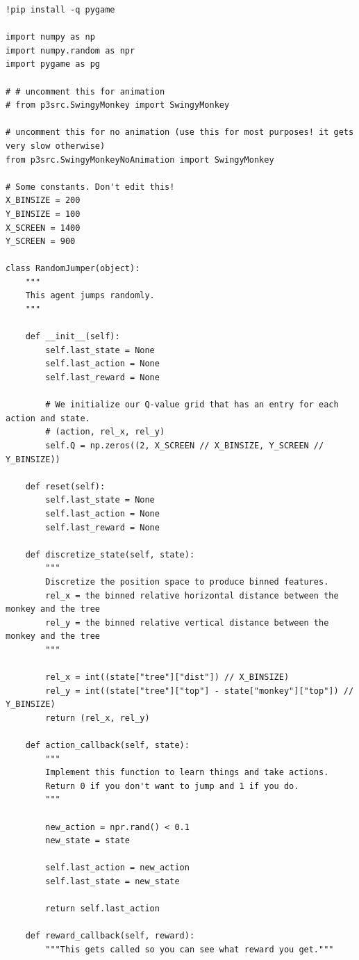 \documentclass[submit]{../harvardml}
\begin{document}
\lstset{style=pythonstyle}

\begin{lstlisting}
!pip install -q pygame

import numpy as np
import numpy.random as npr
import pygame as pg

# # uncomment this for animation
# from p3src.SwingyMonkey import SwingyMonkey

# uncomment this for no animation (use this for most purposes! it gets very slow otherwise)
from p3src.SwingyMonkeyNoAnimation import SwingyMonkey

# Some constants. Don't edit this!
X_BINSIZE = 200
Y_BINSIZE = 100
X_SCREEN = 1400
Y_SCREEN = 900

class RandomJumper(object):
    """
    This agent jumps randomly.
    """

    def __init__(self):
        self.last_state = None
        self.last_action = None
        self.last_reward = None

        # We initialize our Q-value grid that has an entry for each action and state.
        # (action, rel_x, rel_y)
        self.Q = np.zeros((2, X_SCREEN // X_BINSIZE, Y_SCREEN // Y_BINSIZE))

    def reset(self):
        self.last_state = None
        self.last_action = None
        self.last_reward = None

    def discretize_state(self, state):
        """
        Discretize the position space to produce binned features.
        rel_x = the binned relative horizontal distance between the monkey and the tree
        rel_y = the binned relative vertical distance between the monkey and the tree
        """

        rel_x = int((state["tree"]["dist"]) // X_BINSIZE)
        rel_y = int((state["tree"]["top"] - state["monkey"]["top"]) // Y_BINSIZE)
        return (rel_x, rel_y)

    def action_callback(self, state):
        """
        Implement this function to learn things and take actions.
        Return 0 if you don't want to jump and 1 if you do.
        """

        new_action = npr.rand() < 0.1
        new_state = state

        self.last_action = new_action
        self.last_state = new_state

        return self.last_action

    def reward_callback(self, reward):
        """This gets called so you can see what reward you get."""


\end{lstlisting}
\end{document}
